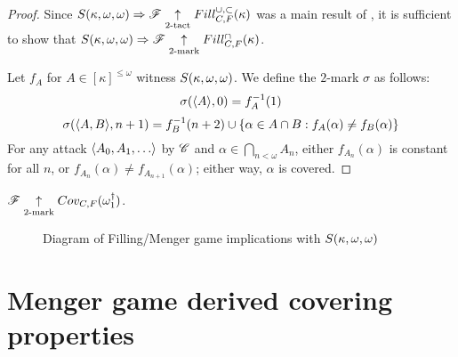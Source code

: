 \begin{proof}
  Since $S(\kappa,\omega,\omega)\Rightarrow\mathscr{F} \underset{2\text{-tact}}{\uparrow}Fill^{\cup,\subset}_{C,F}(\kappa)$ was
  a main result of \cite{MR1129143}, it is sufficient to show that
  $S(\kappa,\omega,\omega)\Rightarrow \mathscr{F} \underset{2\text{-mark}}{\uparrow}Fill^{\cap}_{C,F}(\kappa)$.

  Let $f_A$ for $A\in[\kappa]^{\leq\omega}$ witness $S(\kappa,\omega,\omega)$. We define
  the $2$-mark $\sigma$ as follows:
    \[
      \sigma(\langle A\rangle,0) = f_A^{-1}(1)
    \]
    \[
      \sigma(\langle A,B\rangle,n+1)
        =
      f_B^{-1}(n+2)
        \cup
      \{\alpha \in A\cap B : f_A(\alpha)\not=f_B(\alpha)\}
    \]
  For any attack $\<A_0,A_1,\dots\>$ by $\mathscr{C}$ and
  $\alpha\in\bigcap_{n<\omega}A_n$, either $f_{A_n}(\alpha)$ is constant for
  all $n$, or $f_{A_n}(\alpha)\not=f_{A_{n+1}}(\alpha)$; either way, $\alpha$
  is covered.
\end{proof}

\begin{cor}
  $\mathscr{F} \underset{2\text{-mark}}{\uparrow}Cov_{C,F}(\omega^\dagger_1)$.
\end{cor}

\begin{figure}[h]\label{fillingGamesDiagram2}
\begin{center}
\end{center}
\caption{Diagram of Filling/Menger game implications with $S(\kappa,\omega,\omega)$}
\end{figure}

\section{Menger game derived covering properties}

